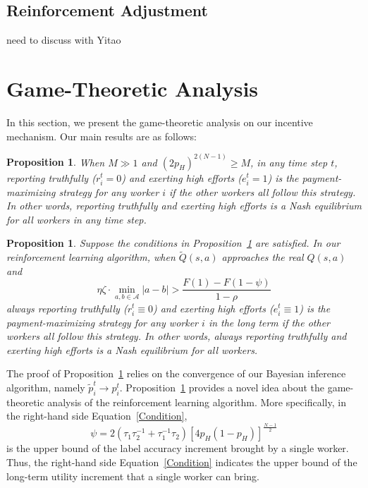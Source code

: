 \documentclass{article}
\newtheorem{proposition}[theorem]{Proposition}
\begin{document}
\subsection{Reinforcement Adjustment}
need to discuss with Yitao




\section{Game-Theoretic Analysis}
In this section, we present the game-theoretic analysis on our incentive mechanism. Our main results are as follows:
\begin{proposition}
\label{OSEqulibrium}
When $M\gg 1$ and $(2p_H)^{2(N-1)} \geq M$, in any time step $t$, reporting truthfully ($r^{t}_i = 0$) and exerting high efforts ($e^{t}_i=1$) is the payment-maximizing strategy for any worker $i$ if the other workers all follow this strategy. In other words, reporting truthfully and exerting high efforts is a Nash equilibrium for all workers in any time step.
\end{proposition}
\begin{proposition}
\label{RMNE}
Suppose the conditions in Proposition~\ref{OSEqulibrium} are satisfied. In our reinforcement learning algorithm, when $\tilde{Q}(s,a)$ approaches the real $Q(s,a)$ and
\begin{equation}
\label{Condition}
\eta \zeta \cdot  {\min}_{a,b\in\mathcal{A}}|a-b|> \frac{F(1)-F(1-\psi)}{1-\rho}
\end{equation}
always reporting truthfully ($r^{t}_i \equiv 0$) and exerting high efforts ($e^{t}_i\equiv 1$) is the payment-maximizing strategy for any worker $i$ in the long term if the other workers all follow this strategy.
In other words, always reporting truthfully and exerting high efforts is a Nash equilibrium for all workers.
\end{proposition}
The proof of Proposition~\ref{OSEqulibrium} relies on the convergence of our Bayesian inference algorithm, namely $\tilde{p}_i^t\rightarrow p_i^t$.
Proposition~\ref{RMNE} provides a novel idea about the game-theoretic analysis of the reinforcement learning algorithm.
More specifically, in the right-hand side Equation~\ref{Condition},
\begin{equation}
\psi =2(\tau_1\tau_2^{-1}+\tau_1^{-1}\tau_2)[4p_H(1-p_H)]^{\frac{N-1}{2}}
\end{equation}
is the upper bound of the label accuracy increment brought by a single worker.
Thus, the right-hand side Equation~\ref{Condition} indicates the upper bound of the long-term utility increment that a single worker can bring.
\end{document}
